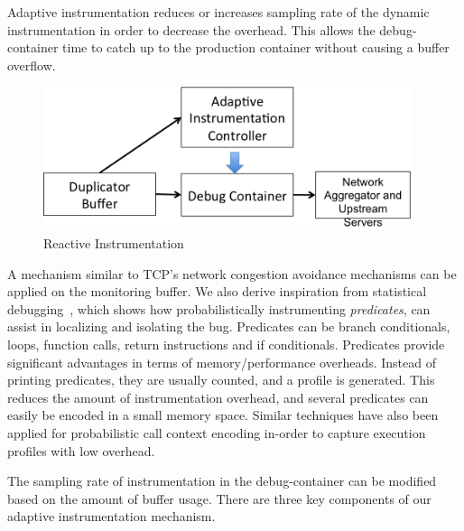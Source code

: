 Adaptive instrumentation reduces or increases sampling rate of the dynamic instrumentation in order to decrease the overhead. 
This allows the debug-container time to catch up to the production container without causing a buffer overflow.

\begin{figure}[ht!]
	\begin{center}
		\includegraphics[width=0.96\textwidth]{queue/figs/reactive-controller.png}
		\caption{Reactive Instrumentation}
		\label{fig:reactive}
	\end{center}
\end{figure}

A mechanism similar to TCP's network congestion avoidance mechanisms can be applied on the monitoring buffer.
We also derive inspiration from statistical debugging~\cite{statisticalPerformance,holmes,statisticalDebugging}, which shows how probabilistically instrumenting \emph{predicates}, can assist in localizing and isolating the bug. 
Predicates can be branch conditionals, loops, function calls, return instructions and if conditionals.
Predicates provide significant advantages in terms of memory/performance overheads.
Instead of printing predicates, they are usually counted, and a profile is generated.
This reduces the amount of instrumentation overhead, and several predicates can easily be encoded in a small memory space.
Similar techniques have also been applied for probabilistic call context encoding in-order to capture execution profiles with low overhead.


The sampling rate of instrumentation in the debug-container can be modified based on the amount of buffer usage.
There are three key components of our adaptive instrumentation mechanism.

